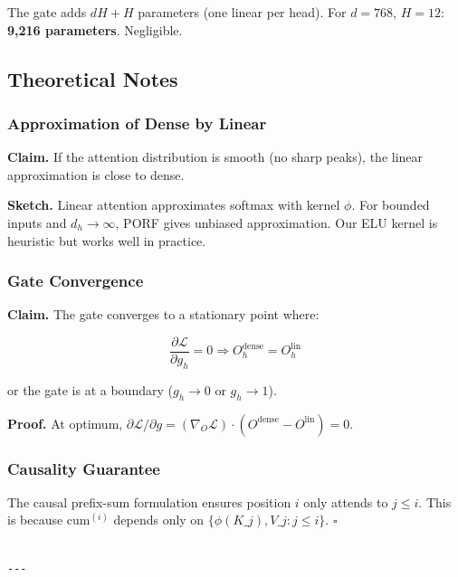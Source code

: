 The gate adds $d H + H$ parameters (one linear per head). For $d = 768$, 
$H = 12$: \textbf{9,216 parameters}. Negligible.

\subsection{Theoretical Notes}

\subsubsection{Approximation of Dense by Linear}

\textbf{Claim.} If the attention distribution is smooth (no sharp peaks), the 
linear approximation is close to dense.

\textbf{Sketch.} Linear attention approximates softmax with kernel $\phi$. For 
bounded inputs and $d_h \to \infty$, PORF gives unbiased approximation. Our 
ELU kernel is heuristic but works well in practice.

\subsubsection{Gate Convergence}

\textbf{Claim.} The gate converges to a stationary point where:

\[
\frac{\partial \mathcal{L}}{\partial g_h} = 0 \Rightarrow O^\text{dense}_h = O^\text{lin}_h
\]

or the gate is at a boundary ($g_h \to 0$ or $g_h \to 1$).

\textbf{Proof.} At optimum, $\partial \mathcal{L} / \partial g = (\nabla_O \mathcal{L}) \cdot (O^\text{dense} - O^\text{lin}) = 0$. 

\subsubsection{Causality Guarantee}

The causal prefix-sum formulation ensures position $i$ only attends to 
$j \le i$. This is because $\text{cum}^{(i)}$ depends only on $\{\phi(K\_j), 
V\_j : j \le i\}$. $\square$
\begin{lstlisting}

---
\end{lstlisting}